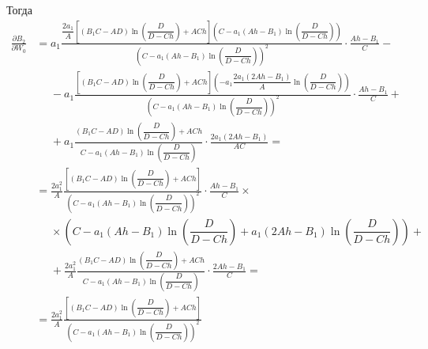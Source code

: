 \documentclass[a4paper,14pt]{article}
\begin{document}
Тогда
\begin{equation*}
  \begin{aligned}
    \frac{\partial B_2}{\partial W_0}
    &=
      a_1
      \frac{
      \dfrac{2 a_1}{A} \left[
      \left(B_1 C - A D \right)
      \ln \left( \dfrac{D}{D - C h} \right)
      + A C h
      \right]
      \left(
      C - a_1 (A h - B_1)
      \ln \left( \dfrac{D}{D - C h} \right)
      \right)
      }{
      {\left(
      C - a_1 (A h - B_1)
      \ln \left( \dfrac{D}{D - C h} \right)
      \right)}^2
      }
      \cdot
      \frac{A h - B_1}{C}
      - \\
    &\phantom{=}
      -
      a_1
      \frac{
      \left[
      \left(B_1 C - A D \right)
      \ln \left( \dfrac{D}{D - C h} \right)
      + A C h
      \right]
      \left(
      - a_1 \dfrac{2 a_1 (2 A h - B_1)}{A}
      \ln \left( \dfrac{D}{D - C h} \right)
      \right)
      }{
      {\left(
      C - a_1 (A h - B_1)
      \ln \left( \dfrac{D}{D - C h} \right)
      \right)}^2
      }
      \cdot
      \frac{A h - B_1}{C} + \\
    &\phantom{=}
      + a_1
      \frac{
      \left(B_1 C - A D \right)
      \ln \left( \dfrac{D}{D - C h} \right)
      + A C h
      }{C - a_1 (A h - B_1)
      \ln \left( \dfrac{D}{D - C h} \right)
      }
      \cdot
      \frac{2 a_1 (2 A h - B_1)}{A C} = \\
    &=
      \frac{2 a_1^2}{A}
      \frac{
      \left[
      \left(B_1 C - A D \right)
      \ln \left( \dfrac{D}{D - C h} \right)
      + A C h
      \right]
      }{
      {\left(
      C - a_1 (A h - B_1)
      \ln \left( \dfrac{D}{D - C h} \right)
      \right)}^2
      }
      \cdot
      \frac{A h - B_1}{C} \times \\
    &\phantom{=}
      \times
      \left(
      C - a_1 (A h - B_1)
      \ln \left( \dfrac{D}{D - C h} \right)
      +
      a_1 (2 A h - B_1)
      \ln \left( \dfrac{D}{D - C h} \right)
      \right) + \\
    &\phantom{=}
      + \frac{2 a_1^2}{A}
      \frac{
      \left(B_1 C - A D \right)
      \ln \left( \dfrac{D}{D - C h} \right)
      + A C h
      }{C - a_1 (A h - B_1)
      \ln \left( \dfrac{D}{D - C h} \right)
      }
      \cdot
      \frac{2 A h - B_1}{C} = \\
    &=
      \frac{2 a_1^2}{A}
      \frac{
      \left[
      \left(B_1 C - A D \right)
      \ln \left( \dfrac{D}{D - C h} \right)
      + A C h
      \right]
      }{
      {\left(
      C - a_1 (A h - B_1)
      \ln \left( \dfrac{D}{D - C h} \right)
      \right)}^2
}
\end{aligned}
\end{equation*}
\end{document}
